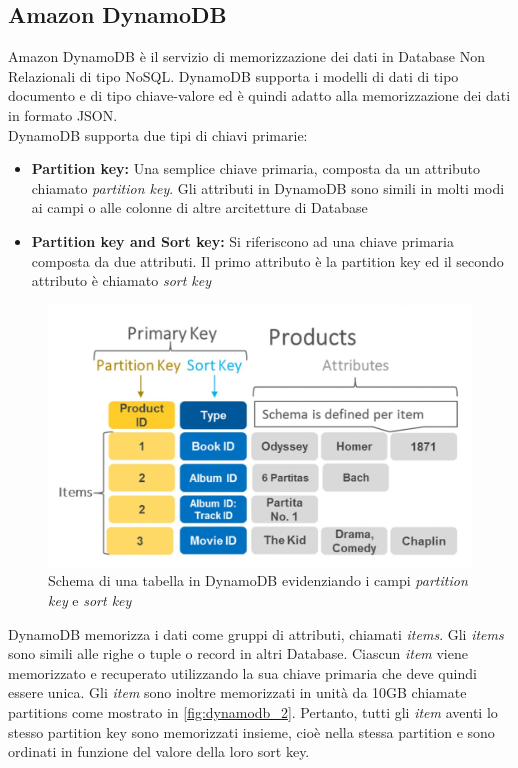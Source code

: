 \subsection{Amazon DynamoDB}
\label{subsec:dynamodb}
Amazon DynamoDB è il servizio di memorizzazione dei dati in Database Non Relazionali di tipo NoSQL. DynamoDB supporta i modelli di dati di tipo documento e di tipo chiave-valore ed è quindi adatto alla memorizzazione dei dati in formato JSON.\\
DynamoDB supporta due tipi di chiavi primarie:
\begin{itemize}
	\item \textbf{Partition key: } Una semplice chiave primaria, composta da un attributo chiamato \textit{partition key}. Gli attributi in DynamoDB sono simili in molti modi ai campi o alle colonne di altre arcitetture di Database
	\item \textbf{Partition key and Sort key: } Si riferiscono ad una chiave primaria composta da due attributi. Il primo attributo è la partition key ed il secondo attributo è chiamato \textit{sort key}
\end{itemize}
\begin{figure}
	\begin{center}
		\includegraphics[width=0.7\columnwidth]{images/dynamodb_1}
	\end{center}
	\caption{Schema di una tabella in DynamoDB evidenziando i campi \textit{partition key} e \textit{sort key}}
	\label{fig:dynamodb_1}
\end{figure}
DynamoDB memorizza i dati come gruppi di attributi, chiamati \textit{items}. Gli \textit{items} sono simili alle righe o tuple o record in altri Database. Ciascun \textit{item} viene memorizzato e recuperato utilizzando la sua chiave primaria che deve quindi essere unica. Gli \textit{item} sono inoltre memorizzati in unità da 10GB chiamate partitions come mostrato in \autoref{fig:dynamodb_2}. Pertanto, tutti gli \textit{item} aventi lo stesso partition key sono memorizzati insieme, cioè nella stessa partition e sono ordinati in funzione del valore della loro sort key.
